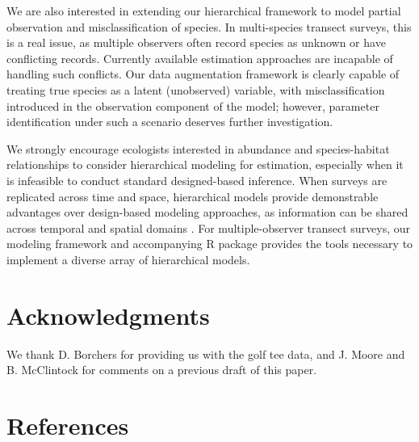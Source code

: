 \documentclass[10pt]{article}
\begin{document}
We are also interested in extending our hierarchical framework to model partial observation and misclassification of species.  In multi-species transect surveys, this is a real issue, as multiple observers often record species as unknown or have conflicting records.  Currently available estimation approaches are incapable of handling such conflicts.  Our data augmentation framework is clearly capable of treating true species as a latent (unobserved) variable, with misclassification introduced in the observation component of the model; however, parameter identification under such a scenario deserves further investigation.

We strongly encourage ecologists interested in abundance and species-habitat relationships to consider hierarchical modeling for estimation, especially when it is infeasible to conduct standard designed-based inference.  When surveys are replicated across time and space, hierarchical models provide demonstrable advantages over design-based modeling approaches, as information can be shared across temporal and spatial domains \cite{RoyleEtAl2007,MooreBarlow2011}.  For multiple-observer transect surveys, our modeling framework and accompanying R package provides the tools necessary to implement a diverse array of hierarchical models.

\section*{Acknowledgments}
We thank D. Borchers for providing us with the golf tee data, and J. Moore and B. McClintock for comments on a previous draft of this paper.

\section*{References}

\clearpage

\end{document}
